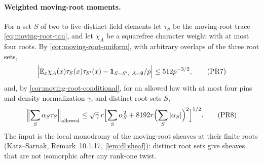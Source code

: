 \paragraph{Weighted moving-root moments.}
For a set $S$ of two to five distinct field elements let $\tau_S$ be the moving-root
trace \eqref{eq:moving-root-tau}, and let $\chi_A$ be a squarefree character weight
with at most four roots. By \cref{cor:moving-root-uniform}, with arbitrary overlaps of
the three root sets,
\[
 \Bigl|\E_x\chi_A(x)\tau_S(x)\tau_{S'}(x)-\frac{\one_{S=S',\ A=\emptyset}}p\Bigr|
 \le512p^{-3/2} ,\tag{PR7}
\]
and, by \cref{cor:moving-root-conditional}, for an allowed law with at most four pins
and density normalization $\gamma$, and distinct root sets $S$,
\[
 \Bigl\|\sum_S\alpha_S\tau_S\Bigr\|_{\rm allowed}\le\sqrt\gamma\,r
 \Bigl[\sum_S\alpha_S^2+8192r\Bigl(\sum_S|\alpha_S|\Bigr)^2\Bigr]^{1/2}. \tag{PR8}
\]
The input is the local monodromy of the moving-root sheaves at their finite roots
(Katz--Sarnak, Remark~10.1.17, \cref{lem:dl:sheaf}): distinct root sets give sheaves
that are not isomorphic after any rank-one twist.

